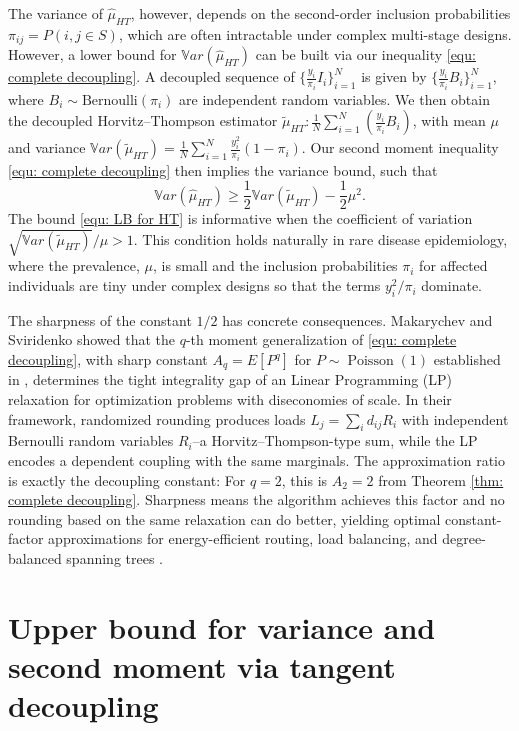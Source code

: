 \documentclass[ECP]{ejpecp} %
\newcommand{\lpar}{\left(}
\newcommand{\rpar}{\right)}
\newcommand{\var}{\mathbb{V}ar}
\begin{document}
The variance of $\hat \mu_{HT}$, however, depends on the second-order inclusion probabilities $\pi_{ij} = P(i,j \in S)$, which are often intractable under complex multi-stage designs.  However, a lower bound for $\var (\hat \mu_{HT})$ can be built via our inequality \eqref{equ: complete decoupling}. A decoupled sequence of $\{ \frac{y_i}{\pi_i} I_i\}_{i=1}^N$ is given by $\{ \frac{y_i}{\pi_i} B_i\}_{i=1}^N$, where $B_i\sim \text{Bernoulli}(\pi_i)$ are independent random variables. We then obtain the decoupled Horvitz–Thompson estimator $ \tilde \mu_{HT}: \frac{1}{N} \sum\limits_{i=1}^N \lpar \frac{y_i}{\pi_i} B_i \rpar$, with mean $\mu$ and variance $\var(\tilde \mu_{HT}) = \frac{1}{N} \sum\limits_{i=1}^N  \frac{y_i^2}{\pi_i}(1-\pi_i)$. Our second moment inequality \eqref{equ: complete decoupling} then implies the variance bound, such that 
\begin{equation}
    \label{equ: LB for HT}
    \var (\hat \mu_{HT}) \geq \frac{1}{2} \var(\tilde \mu_{HT}) - \frac{1}{2}\mu^2.
\end{equation}
The bound \eqref{equ: LB for HT} is informative when the coefficient of variation $ \sqrt{\var(\tilde \mu_{HT})}/\mu>1$. This condition holds naturally in rare disease epidemiology, where the prevalence, $\mu$, is small and the inclusion probabilities $\pi_i$ for affected individuals are tiny under complex designs so that the terms $y_i^2/\pi_i$ dominate.

The sharpness of the constant $1/2$ has concrete consequences.
Makarychev and Sviridenko \cite{makarychev2018solving} showed that the $q$-th moment generalization of \eqref{equ: complete decoupling}, with sharp constant $A_q = E[P^q]$ for $P\sim\operatorname{Poisson}(1)$ established in \cite{de1990bounds}, determines the tight integrality gap of an Linear Programming (LP) relaxation for optimization problems with diseconomies of scale. In their
framework, randomized rounding produces loads $L_j = \sum_i d_{ij} R_i$ with independent Bernoulli random variables $R_i$--a Horvitz--Thompson-type sum, while the LP encodes a dependent coupling with the same marginals. The approximation ratio is exactly the decoupling constant: For $q=2$, this is $A_2 = 2$ from Theorem \ref{thm: complete decoupling}. Sharpness means the algorithm achieves this factor and no rounding based on the same relaxation can do better, yielding optimal constant-factor approximations for energy-efficient routing, load balancing, and degree-balanced spanning trees \cite{makarychev2018solving}.


\section{Upper bound for variance and second moment via tangent decoupling}\label{sec: Main results}
\end{document}
